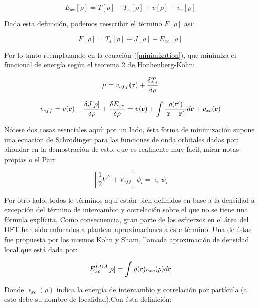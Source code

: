 \documentclass [11pt]{article}
\begin{document}
\begin{equation}
     E_{xc}[\rho]=T[\rho]-T_s[\rho]+v[\rho]-v_s[\rho]
\end{equation}

Dada esta definición, podemos reescribir el término $F[\rho]$ así:

\begin{equation}
	F[\rho]=T_s[\rho]+J[\rho]+E_{xc}[\rho]
\end{equation}

Por lo tanto reemplazando en la ecuación (\ref{minimization}), que  minimiza el funcional de energía según el teorema 2 de Honhenberg-Kohn:

\begin{equation}
	\mu=v_{eff}({\bf r})+\frac{\delta T_s}{\delta \rho}
\end{equation}

\begin{equation}
	v_{eff}=v({\bf r})+\frac{\delta J[\rho]}{\delta \rho}+\frac{\delta E_{xc}}{\delta \rho}=v({\bf r})+\int\frac{\rho({\bf r'})}{|{\bf r-r'}|}d{\bf r}+v_{xc}(\bf r)
\end{equation}

Nótese dos cosas esenciales aquí: por un lado, ésta forma de minimización supone una ecuación de Schrödinger para las funciones de onda orbitales dadas por:{\color{magenta} ahondar en la demostración de esto, que es realmente muy facil, mirar notas propias o el Parr} 

\begin{equation}
	\left[\frac{1}{2}\nabla^2+V_{eff}\right]\psi_i=\upvarepsilon_i \psi_i
\end{equation}

Por otro lado, todos lo términos aquí están bien definidos en base a la densidad a excepción del término de intercambio y correlación sobre el que no se tiene una fórmula explícita. Como consecuencia, gran parte de los esfuerzos en el área del DFT han sido enfocados a plantear aproximaciones a éste término. Una de éstas fue propuesta por los mismos Kohn y Sham, llamada aproximación de densidad local que está dada por:

\begin{equation}
	E_{xc}^{LDA}[\rho]=\int \rho({\bf r})\upvarepsilon_{xc}(\rho)d{\bf r}
\end{equation}

Donde $\upvarepsilon_{xc}(\rho)$ indica la energía de intercambio y correlación por partícula (a esto debe su nombre de localidad).Con ésta definición:
\end{document}

